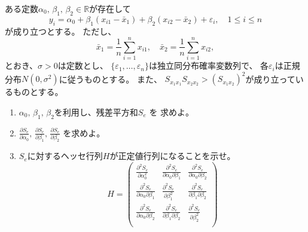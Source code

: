 \documentclass[12pt,b5paper]{ltjsarticle}
\begin{document}
\begin{enumerate}
      ある定数$\alpha_0,\,\beta_1,\,\beta_2\in\mathbb{R}$が存在して
      \begin{equation}
       y_i = \alpha_0 + \beta_1 (x_{i1}-\bar{x}_1) + \beta_2 (x_{i2}-\bar{x}_2) + \varepsilon_i,
       \quad 1\leq i \leq n
      \end{equation}
      が成り立つとする。
      ただし、
      \begin{equation}
       \bar{x}_1 = \frac{1}{n}\sum_{i=1}^{n}x_{i1},
        \quad
        \bar{x}_2 = \frac{1}{n}\sum_{i=1}^{n}x_{i2},
      \end{equation}
      とおき、$\sigma >0$は定数とし、
      $\{\varepsilon_1, \dots , \varepsilon_n\}$は独立同分布確率変数列で、
      各$\varepsilon_i$は正規分布$N(0,\sigma^2)$に従うものとする。
      また、
      $S_{x_1x_1}S_{x_2x_2} > (S_{x_1x_2})^2$が成り立っているものとする。
      \begin{enumerate}
       \item
            $\alpha_0,\,\beta_1,\,\beta_2$を利用し、残差平方和$S_e$ を 求めよ。
       \item
            $\displaystyle
             \frac{\partial S_e}{\partial \alpha_0},\,
             \frac{\partial S_e}{\partial \beta_1},\,
             \frac{\partial S_e}{\partial \beta_2}$
             を求めよ。
       \item
            $S_e$に対するヘッセ行列$H$が正定値行列になることを示せ。
            \begin{equation}
             H=
              \begin{pmatrix}
               \displaystyle \frac{\partial^2 S_e}{\partial \alpha_0^2}
               & \displaystyle\frac{\partial^2 S_e}{\partial \alpha_0 \partial \beta_1}
               & \displaystyle\frac{\partial^2 S_e}{\partial \alpha_0 \partial \beta_2}\\
               \displaystyle \frac{\partial^2 S_e}{\partial \alpha_0\partial \beta_1}
               & \displaystyle\frac{\partial^2 S_e}{\partial \beta_1^2}
               & \displaystyle\frac{\partial^2 S_e}{\partial \beta_1 \partial \beta_2}\\
               \displaystyle \frac{\partial^2 S_e}{\partial \alpha_0\partial \beta_2}
               & \displaystyle\frac{\partial^2 S_e}{\partial \beta_1\partial \beta_2}
               & \displaystyle\frac{\partial^2 S_e}{\partial \beta_2^2}\\
              \end{pmatrix}
            \end{equation}
      \end{enumerate}


\end{enumerate}
\end{document}
